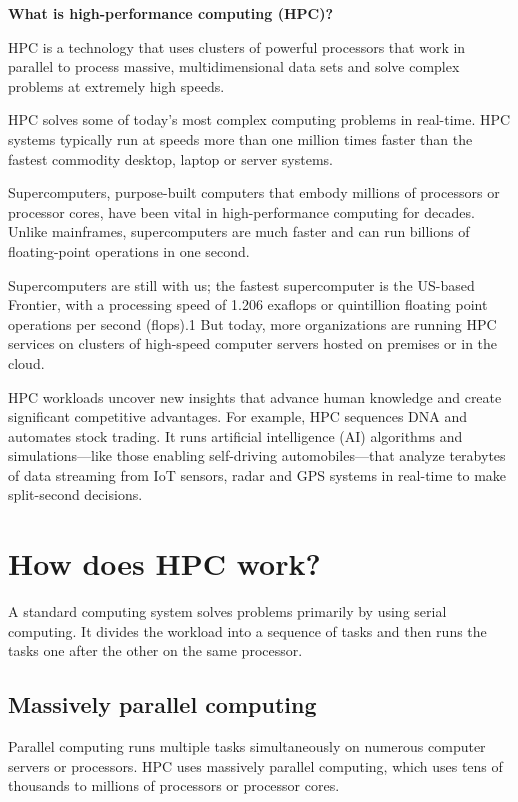 \documentclass[11pt]{article}
\begin{document}
{\LARGE\bfseries\color{hpcblue} What is high-performance computing (HPC)?}

\vspace{0.8em}

HPC is a technology that uses clusters of powerful processors that work in parallel to process massive, multidimensional data sets and solve complex problems at extremely high speeds.

HPC solves some of today's most complex computing problems in real-time. HPC systems typically run at speeds more than one million times faster than the fastest commodity desktop, laptop or server systems.

Supercomputers, purpose-built computers that embody millions of processors or processor cores, have been vital in high-performance computing for decades. Unlike mainframes, supercomputers are much faster and can run billions of floating-point operations in one second.

Supercomputers are still with us; the fastest supercomputer is the US-based Frontier, with a processing speed of 1.206 exaflops or quintillion floating point operations per second (flops).1 But today, more organizations are running HPC services on clusters of high-speed computer servers hosted on premises or in the cloud.

HPC workloads uncover new insights that advance human knowledge and create significant competitive advantages. For example, HPC sequences DNA and automates stock trading. It runs artificial intelligence (AI) algorithms and simulations—like those enabling self-driving automobiles—that analyze terabytes of data streaming from IoT sensors, radar and GPS systems in real-time to make split-second decisions.

\section{How does HPC work?}

A standard computing system solves problems primarily by using serial computing. It divides the workload into a sequence of tasks and then runs the tasks one after the other on the same processor.

\subsection{Massively parallel computing}

Parallel computing runs multiple tasks simultaneously on numerous computer servers or processors. HPC uses massively parallel computing, which uses tens of thousands to millions of processors or processor cores.
\end{document}

